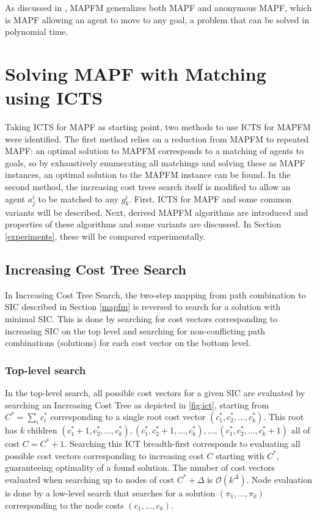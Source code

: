 \documentclass[english,10pt]{article}
\begin{document}
	As discussed in \cite{ma2016}, MAPFM generalizes both MAPF and anonymous MAPF, which is MAPF allowing an agent to move to any goal, a problem that can be solved in polynomial time.
	\section{Solving MAPF with Matching using ICTS} %
	\label{section:icts-matching}
	Taking ICTS for MAPF as starting point, two methods to use ICTS for MAPFM were identified. The first method relies on a reduction from MAPFM to repeated MAPF: an optimal solution to MAPFM corresponds to a matching of agents to goals, so by exhaustively enumerating all matchings and solving these as MAPF instances, an optimal solution to the MAPFM instance can be found. In the second method, the increasing cost trees search itself is modified to allow an agent $a_j^i$ to be matched to any $g_k^i$. First, ICTS for MAPF and some common variants will be described. Next, derived MAPFM algorithms are introduced and properties of these algorithms and some variants are discussed. In Section \ref{experiments}, these will be compared experimentally.
	\subsection{Increasing Cost Tree Search}
	\label{icts}
	In Increasing Cost Tree Search\cite{sharon2011}, the two-step mapping from path combination to SIC described in Section \ref{mapfm} is reversed to search for a solution with minimal SIC. This is done by searching for cost vectors corresponding to increasing SIC on the top level and searching for non-conflicting path combinations (solutions) for each cost vector on the bottom level. 
	
	\subsubsection{Top-level search}
	In the top-level search, all possible cost vectors for a given SIC are evaluated by searching an Increasing Cost Tree as depicted in \ref{fig:ict}, starting from $C^* = \sum_i c^*_i$ corresponding to a single root cost vector $(c^*_1,c^*_2,\ldots,c^*_k)$. This root has $k$ children $(c^*_1 + 1,c^*_2,\ldots,c^*_k),(c^*_1,c^*_2 + 1,\ldots,c^*_k),\ldots,(c^*_1,c^*_2,\ldots,c^*_k + 1)$ all of cost $C = C^* + 1$. Searching this ICT breadth-first corresponds to evaluating all possible cost vectors corresponding to increasing cost $C$ starting with $C^*$, guaranteeing optimality of a found solution. The number of cost vectors evaluated when searching up to nodes of cost $C^* + \Delta$ is $\mathcal{O}(k^\Delta)$. Node evaluation is done by a low-level search that searches for a solution $(\pi_1,\ldots,\pi_k)$ corresponding to the node costs $(c_1,\ldots,c_k)$.
	
\end{document}
